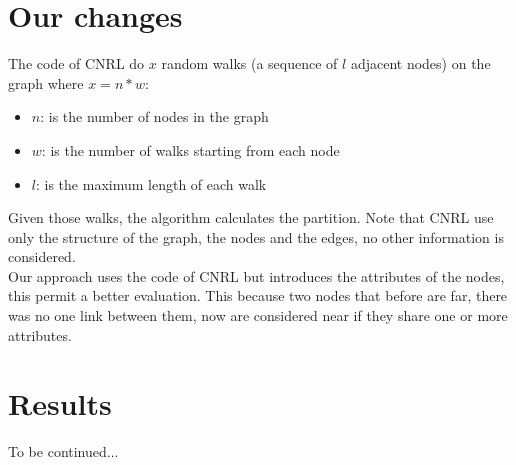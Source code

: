\documentclass[epsfig,a4paper,11pt,titlepage,twoside,openany]{book}
\begin{document}
\section{Our changes}
The code of CNRL do $x$ random walks (a sequence of $l$ adjacent nodes) on the graph where $x=n*w$: 
\begin{itemize}
	\item $n$: is the number of nodes in the graph
	\item $w$: is the number of walks starting from each node
	\item $l$: is the maximum length of each walk
\end{itemize}
Given those walks, the algorithm calculates the partition. Note that CNRL use only the structure of the graph, the nodes and the edges, no other information is considered.\\
Our approach uses the code of CNRL but introduces the attributes of the nodes, this permit a better evaluation. This because two nodes that before are far, there was no one link between them, now are considered near if they share one or more attributes.
%
\section{Results}
To be continued...

%
%
%
%
\newpage
%
\ifcomment	%
	
\end{document}
